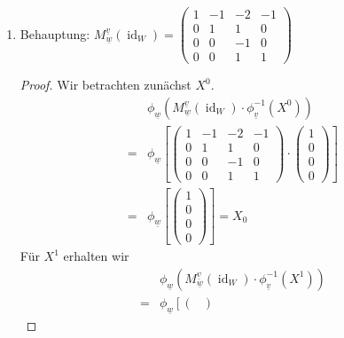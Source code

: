 \documentclass{article}
\newcommand{\id}{\operatorname{id}}
\begin{document}
\begin{enumerate}[(a)]
\begin{enumerate}[1.)]
\begin{proof}
\begin{align*}
                =& 3X^2 = \partial(X^3 + X^0)
            \end{align*} 
        \end{proof}
        \item Behauptung: $M_{\underline{w}}^{\underline{v}} (\id_W) = 
        \begin{pmatrix}
            1 & -1 & -2 & -1\\
            0 & 1 & 1 & 0\\
            0 & 0 & -1 & 0\\
            0 & 0 & 1 & 1
        \end{pmatrix}$
        \begin{proof}
            Wir betrachten zunächst $X^0$.
            \begin{align*}
                &\phi_{\underline{w}}(M_{\underline{w}}^{\underline{v}} (\id_W) \cdot \phi_{\underline{v}}^{-1}(X^0))\\
                =&\phi_{\underline{w}}
                    \left[
                    \begin{pmatrix}
                        1 & -1 & -2 & -1\\
                        0 & 1 & 1 & 0\\
                        0 & 0 & -1 & 0\\
                        0 & 0 & 1 & 1
                    \end{pmatrix} \cdot 
                    \begin{pmatrix}1 \\ 0 \\ 0 \\ 0\end{pmatrix}
                    \right]\\
                =&\phi_{\underline{w}}
                    \left[\begin{pmatrix}1 \\ 0 \\ 0 \\ 0\end{pmatrix}\right]
                    = X_0
            \end{align*}
            Für $X^1$ erhalten wir
            \begin{align*}
                &\phi_{\underline{w}}(M_{\underline{w}}^{\underline{v}} (\id_W) \cdot \phi_{\underline{v}}^{-1}(X^1))\\
                =&\phi_{\underline{w}}
                    \left[
                    \begin{pmatrix}

\end{pmatrix}
\end{align*}
\end{proof}
\end{enumerate}
\end{enumerate}
\end{document}
